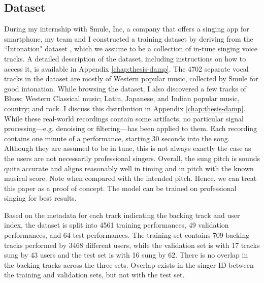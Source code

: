 \subsection{Dataset}
\label{sec:dataset-autotune}
During my internship with Smule, Inc, a company that offers a singing app for smartphone, my team and I constructed a training dataset by deriving from the ``Intonation" dataset \cite{wager2018intonation}, which we assume to be a collection of in-tune singing voice tracks. A detailed description of the dataset, including instructions on how to access it, is available in Appendix \ref{chap:thesis-damp}. The 4702 separate vocal tracks in the dataset are mostly of Western popular music, collected by Smule for good intonation. While browsing the dataset, I also discovered a few tracks of Blues; Western Classical music; Latin, Japanese, and Indian popular music, country; and rock. I discuss this distribution in Appendix \ref{chap:thesis-damp}. While these real-world recordings contain some artifacts, no particular signal processing---e.g. denoising or filtering---has been applied to them. Each recording contains one minute of a performance, starting 30 seconds into the song. Although they are assumed to be in tune, this is not always exactly the case as the users are not necessarily professional singers. Overall, the sung pitch is sounds quite accurate and aligns reasonably well in timing and in pitch with the known musical score. Note when compared with the intended pitch. Hence, we can treat this paper as a proof of concept. The model can be trained on professional singing for best results.

Based on the metadata for each track indicating the backing track and user index, the dataset is split into 4561 training performances, 49 validation performances, and 64 test performances. The training set contains 709 backing tracks performed by 3468 different users, while the validation set is with 17 tracks sung by 43 users and the test set is with 16 sung by 62. There is no overlap in the backing tracks across the three sets. Overlap exists in the singer ID between the training and validation sets, but not with the test set. 

